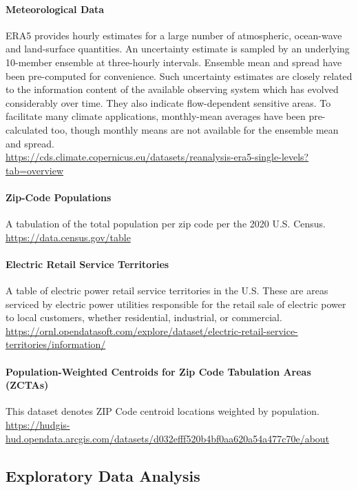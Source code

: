 \documentclass[11 pt]{article}  %
\begin{document}
\paragraph{Meteorological Data} ERA5 provides hourly estimates for a large number 
of atmospheric, ocean-wave and land-surface quantities. An uncertainty estimate 
is sampled by an underlying 10-member ensemble at three-hourly intervals. 
Ensemble mean and spread have been pre-computed for convenience. Such uncertainty 
estimates are closely related to the information content of the available observing 
system which has evolved considerably over time. They also indicate flow-dependent 
sensitive areas. To facilitate many climate applications, monthly-mean averages 
have been pre-calculated too, though monthly means are not available for the 
ensemble mean and spread. \\
\url{https://cds.climate.copernicus.eu/datasets/reanalysis-era5-single-levels?tab=overview}

\paragraph{Zip-Code Populations} A tabulation of the total population per zip code
per the 2020 U.S. Census. \\
\url{https://data.census.gov/table}

\paragraph{Electric Retail Service Territories} A table of electric power retail 
service territories in the U.S. These are areas serviced by electric power utilities 
responsible for the retail sale of electric power to local customers, whether 
residential, industrial, or commercial. \\
\url{https://ornl.opendatasoft.com/explore/dataset/electric-retail-service-territories/information/}

\paragraph{Population-Weighted Centroids for Zip Code Tabulation Areas (ZCTAs)} 
This dataset denotes ZIP Code centroid locations weighted by population. \\
\url{https://hudgis-hud.opendata.arcgis.com/datasets/d032efff520b4bf0aa620a54a477c70e/about}

\subsection{Exploratory Data Analysis}
\end{document}
